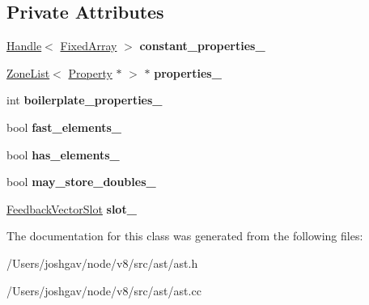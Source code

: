 \subsection*{Private Attributes}
\begin{DoxyCompactItemize}
\item 
\hyperlink{classv8_1_1internal_1_1_handle}{Handle}$<$ \hyperlink{classv8_1_1internal_1_1_fixed_array}{Fixed\+Array} $>$ {\bfseries constant\+\_\+properties\+\_\+}\hypertarget{classv8_1_1internal_1_1_object_literal_aa96ce897574a419095dd6761af08d7c6}{}\label{classv8_1_1internal_1_1_object_literal_aa96ce897574a419095dd6761af08d7c6}

\item 
\hyperlink{classv8_1_1internal_1_1_zone_list}{Zone\+List}$<$ \hyperlink{classv8_1_1internal_1_1_object_literal_property}{Property} $\ast$ $>$ $\ast$ {\bfseries properties\+\_\+}\hypertarget{classv8_1_1internal_1_1_object_literal_a5a90bfdd76716351ec06e586e7bd5f4f}{}\label{classv8_1_1internal_1_1_object_literal_a5a90bfdd76716351ec06e586e7bd5f4f}

\item 
int {\bfseries boilerplate\+\_\+properties\+\_\+}\hypertarget{classv8_1_1internal_1_1_object_literal_af7383aa135dfa0cd15b95e5e4b772eef}{}\label{classv8_1_1internal_1_1_object_literal_af7383aa135dfa0cd15b95e5e4b772eef}

\item 
bool {\bfseries fast\+\_\+elements\+\_\+}\hypertarget{classv8_1_1internal_1_1_object_literal_a1c6ffc38dd2d4b57c1b01aa19c2e568a}{}\label{classv8_1_1internal_1_1_object_literal_a1c6ffc38dd2d4b57c1b01aa19c2e568a}

\item 
bool {\bfseries has\+\_\+elements\+\_\+}\hypertarget{classv8_1_1internal_1_1_object_literal_af90be09777a3dd806f429a44d7a7c8c5}{}\label{classv8_1_1internal_1_1_object_literal_af90be09777a3dd806f429a44d7a7c8c5}

\item 
bool {\bfseries may\+\_\+store\+\_\+doubles\+\_\+}\hypertarget{classv8_1_1internal_1_1_object_literal_a6bb590ed5e22ad951f6a868571cc2e71}{}\label{classv8_1_1internal_1_1_object_literal_a6bb590ed5e22ad951f6a868571cc2e71}

\item 
\hyperlink{classv8_1_1internal_1_1_feedback_vector_slot}{Feedback\+Vector\+Slot} {\bfseries slot\+\_\+}\hypertarget{classv8_1_1internal_1_1_object_literal_a6217cb96c018abfe59777e38b6f92335}{}\label{classv8_1_1internal_1_1_object_literal_a6217cb96c018abfe59777e38b6f92335}

\end{DoxyCompactItemize}


The documentation for this class was generated from the following files\+:\begin{DoxyCompactItemize}
\item 
/\+Users/joshgav/node/v8/src/ast/ast.\+h\item 
/\+Users/joshgav/node/v8/src/ast/ast.\+cc\end{DoxyCompactItemize}
